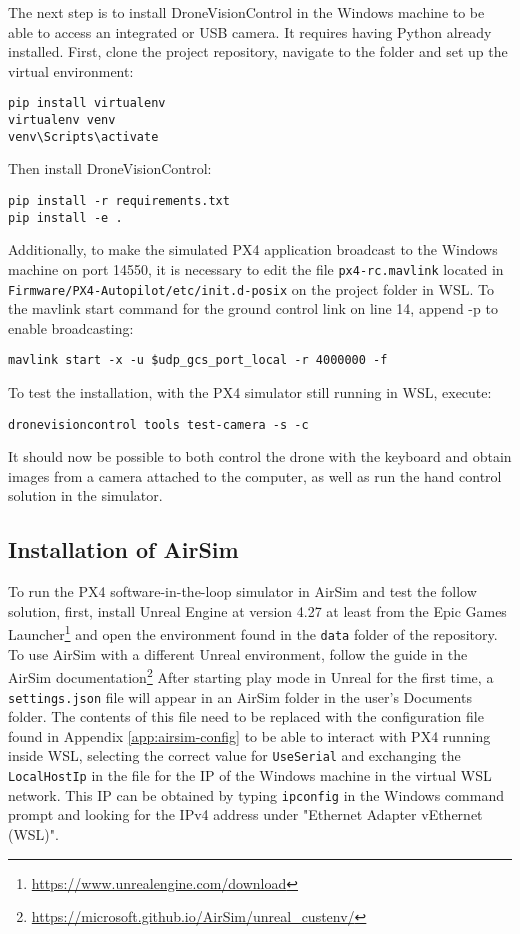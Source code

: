 The next step is to install DroneVisionControl in the Windows machine to be able to access an integrated or USB camera.
It requires having Python already installed.
First, clone the project repository, navigate to the folder and set up the virtual environment:
\begin{verbatim}
pip install virtualenv
virtualenv venv
venv\Scripts\activate
\end{verbatim}

Then install DroneVisionControl:
\begin{verbatim}
pip install -r requirements.txt
pip install -e .
\end{verbatim}

Additionally, to make the simulated PX4 application broadcast to the Windows machine on port 14550, it is necessary to edit the file \texttt{px4-rc.mavlink} located in \texttt{Firmware/PX4-Autopilot/etc/init.d-posix} on the project folder in WSL.
To the mavlink start command for the ground control link on line 14, append -p to enable broadcasting:
\begin{verbatim}
mavlink start -x -u $udp_gcs_port_local -r 4000000 -f
\end{verbatim}

To test the installation, with the PX4 simulator still running in WSL, execute:
\begin{verbatim}
dronevisioncontrol tools test-camera -s -c
\end{verbatim}
It should now be possible to both control the drone with the keyboard and obtain images from a camera attached to the computer, as well as run the hand control solution in the simulator.

\subsection{Installation of AirSim}
\label{app:install-airsim}

To run the PX4 software-in-the-loop simulator in AirSim and test the follow solution,
first, install Unreal Engine at version 4.27 at least from the Epic Games Launcher\footnote{\url{https://www.unrealengine.com/download}} and open the environment found in the \texttt{data} folder of the repository.
To use AirSim with a different Unreal environment, follow the guide in the AirSim documentation\footnote{\url{https://microsoft.github.io/AirSim/unreal_custenv/}}
After starting play mode in Unreal for the first time, a \texttt{settings.json} file will appear in an AirSim folder in the user's Documents folder.
The contents of this file need to be replaced with the configuration file found in Appendix \ref{app:airsim-config} to be able to interact with PX4 running inside WSL, selecting the correct value for \texttt{UseSerial} and exchanging the \texttt{LocalHostIp} in the file for the IP of the Windows machine in the virtual WSL network.
This IP can be obtained by typing \texttt{ipconfig} in the Windows command prompt and looking for the IPv4 address under "Ethernet Adapter vEthernet (WSL)".

